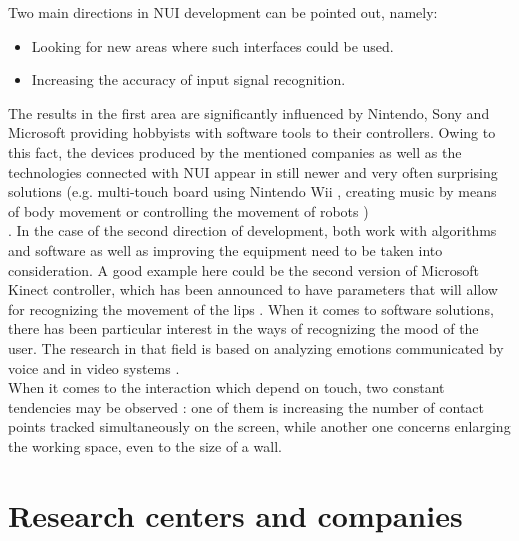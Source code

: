 \documentclass{jacsart}
\begin{document}
\indent Two main directions in NUI development can be pointed out, namely:
\begin{itemize}
\item{Looking for new areas where such interfaces could be used.}
\item{Increasing the accuracy of input signal recognition.}
\end{itemize}

\indent The results in the first area are significantly influenced by Nintendo, Sony and Microsoft providing hobbyists with software tools to their controllers. Owing to this fact, the devices produced by the mentioned companies as well as the technologies connected with NUI appear in still newer and very often surprising solutions (e.g. multi-touch board using Nintendo Wii \cite{Lee2008}, creating music by means of body movement \cite{Challinor2011} or controlling the movement of robots \cite{Veltrop2011})\\.
\indent In the case of the second direction of development, both work with algorithms and software as well as improving the equipment need to be taken into consideration. A good example here could be the second version of Microsoft Kinect controller, which has been announced to have parameters that will allow for recognizing the movement of the lips \cite{Akerman2011}. When it comes to software solutions, there has been particular interest in the ways of recognizing the mood of the user. The research in that field is based on analyzing emotions communicated by voice \cite{Lee2007, Malcangi2011} and in video systems \cite{Fang2011, Fasel2003, Gallagher2010, Liu2009}.\\
\indent When it comes to the interaction which depend on touch, two constant tendencies may be observed \cite{Li2000}: one of them is increasing the number of contact points tracked simultaneously on the screen, while another one concerns enlarging the working space, even to the size of a wall.\\


\section{Research centers and companies} \label{sec:centers}
\end{document}
